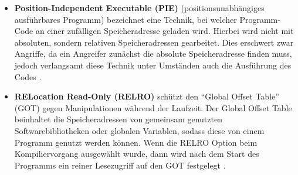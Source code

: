 \documentclass[a4paper]{book}
\begin{document}
\begin{large}
\begin{onehalfspace}
\begin{itemize}
\item \textbf{Position-Independent Executable (PIE)} (positionsunabhängiges ausführbares Programm) bezeichnet eine Technik, bei welcher Programm-Code an einer zufälligen \mbox Speicheradresse geladen wird. Hierbei wird nicht mit absoluten, sondern relativen Speicheradressen gearbeitet. Dies erschwert zwar Angriffe, da ein Angreifer zunächst die absolute Speicheradresse finden muss, jedoch verlangsamt diese Technik unter Umständen auch die Ausführung des Codes \cite{Payer.2012}. 

\item \textbf{RELocation Read-Only (RELRO)} schützt den “Global Offset Table” (GOT) gegen Manipulationen während der Laufzeit. Der Global Offset Table beinhaltet die \mbox Speicheradressen von gemeinsam genutzten Softwarebibliotheken oder globalen \mbox Variablen, sodass diese von einem Programm genutzt werden können. Wenn die \mbox RELRO Option beim Kompiliervorgang ausgewählt wurde, dann wird nach dem Start des Programms ein reiner Lesezugriff auf den GOT festgelegt \cite[p.~12]{PeterWeidenbachJohannesvomDorp.2020}. 

\end{itemize}
\end{onehalfspace}



\end{large}
\end{document}
